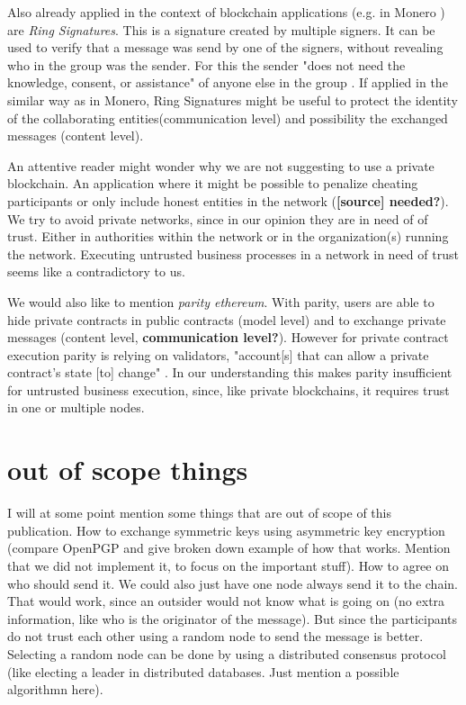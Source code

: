 \documentclass[runningheads]{llncs}
\newcommand{\comment}[1]{}
\begin{document}
\comment{However we do not see how we could use zk-SNARKs to keep the model level secret. This might be a field of future work and if feasible, might be a better solution than the one we are providing right now.}


Also already applied in the context of blockchain applications (e.g. in Monero \cite{noether2016ring}) are \textit{Ring Signatures}. This is a signature created by multiple signers. It can be used to verify that a message was send by one of the signers, without revealing who in the group was the sender. For this the sender "does not need the knowledge, consent, or assistance" of anyone else in the group  \cite{rivest2001leak}. 
If applied in the similar way as in Monero, Ring Signatures might be useful to protect the identity of the collaborating entities(communication level) and possibility the exchanged messages (content level).  



An attentive reader might wonder why we are not suggesting to use a private blockchain. An application where it might be possible to penalize cheating participants or only include honest entities in the network (\textbf{[source] needed?}). We try to avoid private networks, since in our opinion they are in need of of trust. Either in authorities within the network or in the organization(s) running the network. Executing untrusted business processes in a network in need of trust seems like a contradictory to us.


We would also like to mention \textit{parity ethereum}. With parity, users are able to hide private contracts in public contracts (model level) and to exchange private messages (content level, \textbf{communication level?}). However for private contract execution parity is relying on validators, "account[s] that can allow a private contract’s state [to] change" \cite{parity}. In our understanding this makes parity insufficient for untrusted business execution, since, like private blockchains, it requires trust in one or multiple nodes. 




\section{out of scope things}
I will at some point mention some things that are out of scope of this publication. How to exchange symmetric keys using asymmetric key encryption (compare OpenPGP and give broken down example of how that works. Mention that we did not implement it, to focus on the important stuff). How to agree on who should send it. We could also just have one node always send it to the chain. That would work, since an outsider would not know what is going on (no extra information, like who is the originator of the message). But since the participants do not trust each other using a random node to send the message is better. Selecting a random node can be done by using a distributed consensus protocol (like electing a leader in distributed databases. Just mention a possible algorithmn here).   
\end{document}

